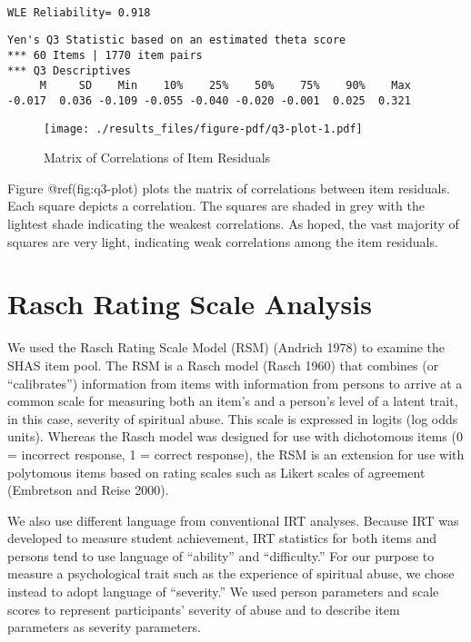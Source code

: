 \documentclass[
  letterpaper,
  DIV=11,
  numbers=noendperiod]{scrreport}
\begin{document}
\begin{verbatim}

WLE Reliability= 0.918 
\end{verbatim}

\begin{verbatim}
Yen's Q3 Statistic based on an estimated theta score 
*** 60 Items | 1770 item pairs
*** Q3 Descriptives
     M     SD    Min    10%    25%    50%    75%    90%    Max 
-0.017  0.036 -0.109 -0.055 -0.040 -0.020 -0.001  0.025  0.321 
\end{verbatim}

\begin{figure}

{\centering \texttt{[image: ./results\_files/figure-pdf/q3-plot-1.pdf]}

}

\caption{Matrix of Correlations of Item Residuals}

\end{figure}

Figure @ref(fig:q3-plot) plots the matrix of correlations between item
residuals. Each square depicts a correlation. The squares are shaded in
grey with the lightest shade indicating the weakest correlations. As
hoped, the vast majority of squares are very light, indicating weak
correlations among the item residuals.

\hypertarget{rasch-rating-scale-analysis}{%
\section*{Rasch Rating Scale
Analysis}\label{rasch-rating-scale-analysis}}

We used the Rasch Rating Scale Model (RSM) (Andrich 1978) to examine the
SHAS item pool. The RSM is a Rasch model (Rasch 1960) that combines (or
``calibrates'') information from items with information from persons to
arrive at a common scale for measuring both an item's and a person's
level of a latent trait, in this case, severity of spiritual abuse. This
scale is expressed in logits (log odds units). Whereas the Rasch model
was designed for use with dichotomous items (0 = incorrect response, 1 =
correct response), the RSM is an extension for use with polytomous items
based on rating scales such as Likert scales of agreement (Embretson and
Reise 2000).

We also use different language from conventional IRT analyses. Because
IRT was developed to measure student achievement, IRT statistics for
both items and persons tend to use language of ``ability'' and
``difficulty.'' For our purpose to measure a psychological trait such as
the experience of spiritual abuse, we chose instead to adopt language of
``severity.'' We used person parameters and scale scores to represent
participants' severity of abuse and to describe item parameters as
severity parameters.
\end{document}
